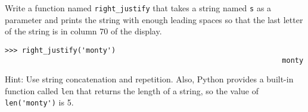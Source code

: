 \documentclass[
DIV=11,
fontsize=12,
twoside,
headinclude=false,
titlepage=firstiscover,
abstract=true,
headsepline=true,
footsepline=true,
chapterprefix=true, %
headings=big,
bibliography=totoc,%
captions=tableheading
]{scrbook}
\theoremstyle{definition}
\begin{document}
\begin{exercise}
\normalfont
{}

Write a function named \verb"right_justify" that takes a string
named {\texttt s} as a parameter and prints the string with enough
leading spaces so that the last letter of the string is in column 70
of the display.

\begin{lstlisting}
>>> right_justify('monty')
                                                                 monty
\end{lstlisting}

Hint: Use string concatenation and repetition.  Also,
Python provides a built-in function called {\texttt len} that
returns the length of a string, so the value of \verb"len('monty')" is 5.

\end{exercise}
\end{document}
